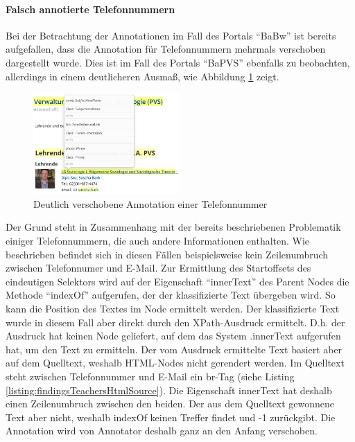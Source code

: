     \paragraph{Falsch annotierte Telefonnummern}
    Bei der Betrachtung der Annotationen im Fall des Portals "`BaBw"'
    ist bereits aufgefallen, dass die Annotation für Telefonnummern
    mehrmals verschoben dargestellt wurde.
    Dies ist im Fall des Portals "`BaPVS"' ebenfalls zu beobachten,
    allerdings in einem deutlicheren Ausmaß,
    wie Abbildung \ref{image:findingTeachersBaPVSWrongPhone} zeigt.

    \begin{figure}[htb]
        \centering
        \includegraphics[width=0.5\textwidth]{../resources/findings/case-study-1/bapvs/annotations/triple-annotation.png}
        \caption{Deutlich verschobene Annotation einer Telefonnummer}
        \label{image:findingTeachersBaPVSWrongPhone}
    \end{figure}

    Der Grund steht in Zusammenhang mit der bereits beschriebenen Problematik
    einiger Telefonnummern, die auch andere Informationen enthalten.
    Wie beschrieben befindet sich in diesen Fällen beispielsweise kein
    Zeilenumbruch zwischen Telefonnumer und E-Mail.
    Zur Ermittlung des Startoffsets des eindeutigen Selektors
    wird auf der Eigenschaft "`innerText"' des Parent Nodes
    die Methode "`indexOf"' aufgerufen, der der klassifizierte Text
    übergeben wird. So kann die Position des Textes im Node ermittelt werden.
    Der klassifizierte Text wurde in diesem Fall aber direkt durch den
    XPath-Ausdruck ermittelt.
    D.h. der Ausdruck hat keinen Node geliefert, auf dem das System .innerText
    aufgerufen hat, um den Text zu ermitteln.
    Der vom Ausdruck ermittelte Text basiert aber auf dem Quelltext,
    weshalb HTML-Nodes nicht gerendert werden.
    Im Quelltext steht zwischen Telefonnummer und E-Mail ein br-Tag
    (siehe Listing \ref{listing:findingsTeachersHtmlSource}).
    Die Eigenschaft innerText hat deshalb einen Zeilenumbruch zwischen den beiden.
    Der aus dem Quelltext gewonnene Text aber nicht,
    weshalb indexOf keinen Treffer findet und -1 zurückgibt.
    Die Annotation wird von Annotator deshalb ganz an den Anfang verschoben.